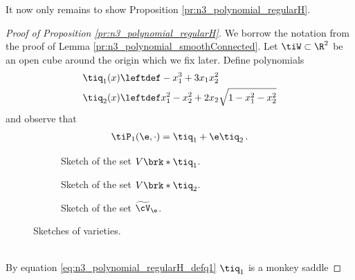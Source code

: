It now only remains to show Proposition \ref{pr:n3_polynomial_regularH}.
\newpage
\begin{proof}[Proof of Proposition \ref{pr:n3_polynomial_regularH}]
  We borrow the notation from the proof of Lemma \ref{pr:n3_polynomial_smoothConnected}.
  Let $\tiW\subset\R^2$ be an open cube around the origin which we fix later.
  Define polynomials
  \begin{align}
    \tiq_1(x)&\leftdef-x_1^3+3x_1x_2^2\label{eq:n3_polynomial_regularH_defq1} \\ 
    \tiq_2(x)&\leftdef x_1^2-x_2^2+2x_2\sqrt{1-x_1^2-x_2^2} \label{eq:n3_polynomial_regularH_defq2}
  \end{align}
  and observe that
  \begin{align}
    \tiP_1(\e,\cdot)=\tiq_1+\e\tiq_2\,.\label{eq:n3_polynomial_regularH_relTiP}
  \end{align}
  \begin{figure}
    \centering
    \begin{subfigure}[b]{0.3\textwidth}
    \centering
    
    \caption{Sketch of the set $V\brk*{\tiq_1}$.}
    \label{fi:n3_polynomial_intersectionOriginDegenerate}
    \end{subfigure}
    \hfill
    \begin{subfigure}[b]{0.3\textwidth}
    \centering
    
    \caption{Sketch of the set $V\brk*{\tiq_2}$.}
    \label{fi:n3_polynomial_intersectionOriginOtherTerm}
    \end{subfigure}
    \hfill
    \begin{subfigure}[b]{0.3\textwidth}
    \centering
    
    \caption{Sketch of the set $\widetilde{\cV}_\e$.}
    \label{fi:n3_polynomial_intersectionOriginRegular}
    \end{subfigure}
    \caption{Sketches of varieties.}
  \end{figure}\\
  \noindent\ignorespaces By equation \eqref{eq:n3_polynomial_regularH_defq1} $\tiq_1$ is a monkey saddle

\end{proof}

